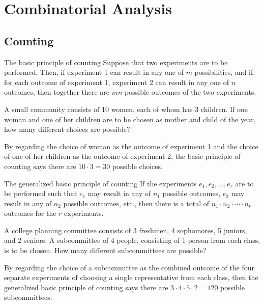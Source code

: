 \section{Combinatorial Analysis}
\subsection{Counting}

\begin{bdef}{The basic principle of counting}
    Suppose that two experiments are to be performed. Then, if experiment 1 can result in any one of $m$ possibilities, and if, for each outcome of experiment 1, experiment 2 can result in any one of $n$ outcomes, then together there are $mn$ possible outcomes of the two experiments.
\end{bdef}

\begin{changebar}
    \begin{example}
        A small community consists of 10 women, each of whom has 3 children. If one woman and one of her children are to be chosen as mother and child of the year, how many different choices are possible?
    \end{example}
    \begin{solution}
        By regarding the choice of woman as the outcome of experiment 1 and the choice of one of her children as the outcome of experiment 2, the basic principle of counting says there are $10\cdot3=30$ possible choices.
    \end{solution}
\end{changebar}

\begin{bdef}{The generalized basic principle of counting}
    If the experiments $e_1, e_2, \dots, e_r$ are to be performed such that $e_1$ may result in any of $n_1$ possible outcomes, $e_2$ may result in any of $n_2$ possible outcomes, etc., then there is a total of $n_1\cdot n_2 \cdot \cdots \cdot n_r$ outcomes for the $r$ experiments. 
\end{bdef}

\begin{changebar}
    \begin{example}
        A college planning committee consists of 3 freshmen, 4 sophomores, 5 juniors, and 2 seniors. A subcommittee of 4 people, consisting of 1 person from each class, is to be chosen. How many different subcommittees are possible?
    \end{example}
    \begin{solution}
        By regarding the choice of a subcommittee as the combined outcome of the four separate experiments of choosing a single representative from each class, then the generalized basic principle of counting says there are $3\cdot 4 \cdot 5 \cdot 2 = 120$ possible subcommittees.
    \end{solution}
\end{changebar}
    
